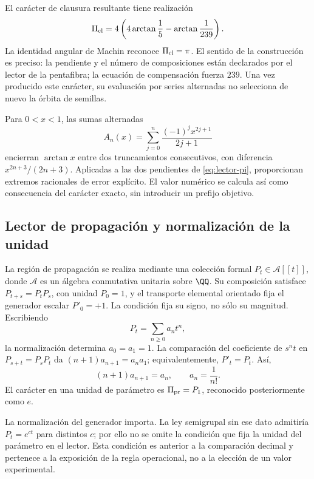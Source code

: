 El carácter de clausura resultante tiene realización
\begin{equation}
 \Pi_{\rm cl}=4\left(4\arctan\frac15-\arctan\frac1{239}\right).
 \label{eq:lector-pi}
\end{equation}
La identidad angular de Machin reconoce \(\Pi_{\rm cl}=\pi\). El sentido de la construcción es preciso: la pendiente y el número de composiciones están declarados por el lector de la pentafibra; la ecuación de compensación fuerza \(239\). Una vez producido este carácter, su evaluación por series alternadas no selecciona de nuevo la órbita de semillas.

Para \(0<x<1\), las sumas alternadas
\[
 A_n(x)=\sum_{j=0}^n\frac{(-1)^jx^{2j+1}}{2j+1}
\]
encierran \(\arctan x\) entre dos truncamientos consecutivos, con diferencia \(x^{2n+3}/(2n+3)\). Aplicadas a las dos pendientes de \eqref{eq:lector-pi}, proporcionan extremos racionales de error explícito. El valor numérico se calcula así como consecuencia del carácter exacto, sin introducir un prefijo objetivo.

\subsection{Lector de propagación y normalización de la unidad}

La región de propagación se realiza mediante una colección formal \(P_t\in\mathcal A[[t]]\), donde \(\mathcal A\) es un álgebra conmutativa unitaria sobre \(\QQ\). Su composición satisface \(P_{t+s}=P_tP_s\), con unidad \(P_0=1\), y el transporte elemental orientado fija el generador escalar \(P'_0=+1\). La condición fija su signo, no sólo su magnitud. Escribiendo
\[
 P_t=\sum_{n\ge0}a_nt^n,
\]
la normalización determina \(a_0=a_1=1\). La comparación del coeficiente de \(s^nt\) en \(P_{s+t}=P_sP_t\) da \((n+1)a_{n+1}=a_na_1\); equivalentemente, \(P'_t=P_t\). Así,
\begin{equation}
 (n+1)a_{n+1}=a_n,\qquad a_n=\frac1{n!}.
 \label{eq:propagacion}
\end{equation}
El carácter en una unidad de parámetro es \(\Pi_{\rm pr}=P_1\), reconocido posteriormente como \(e\).

La normalización del generador importa. La ley semigrupal sin ese dato admitiría \(P_t=e^{ct}\) para distintos \(c\); por ello no se omite la condición que fija la unidad del parámetro en el lector. Esta condición es anterior a la comparación decimal y pertenece a la exposición de la regla operacional, no a la elección de un valor experimental.

